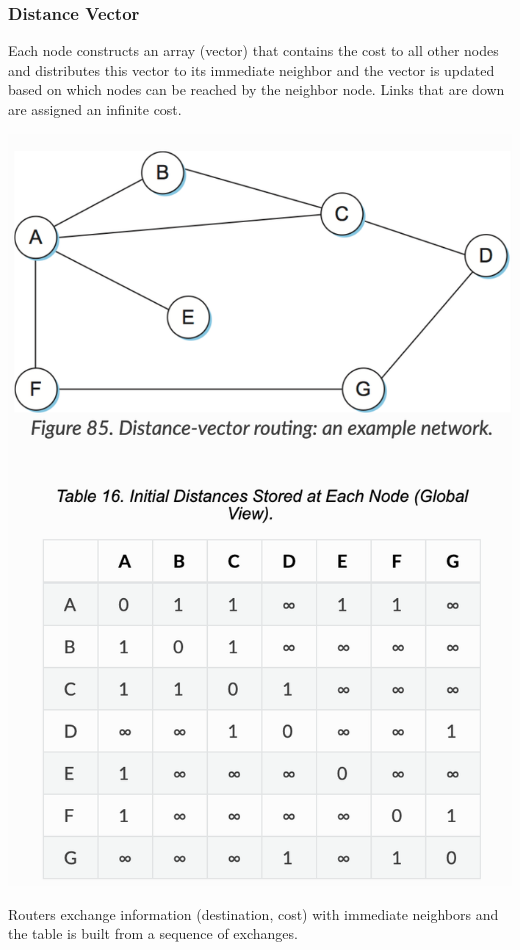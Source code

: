 \documentclass{article}
\begin{document}
  \subsubsection{Distance Vector}
  Each node constructs an array (vector) that contains the cost to all other nodes and distributes this vector to its immediate neighbor and the vector is updated based on which nodes can be reached by the neighbor node. Links that are down are assigned an infinite cost.
  \begin{center}
    \includegraphics[scale=0.5]{DistanceVector}
  \end{center}
  Routers exchange information (destination, cost) with immediate neighbors and the table is built from a sequence of exchanges. \\ \\
\end{document}
